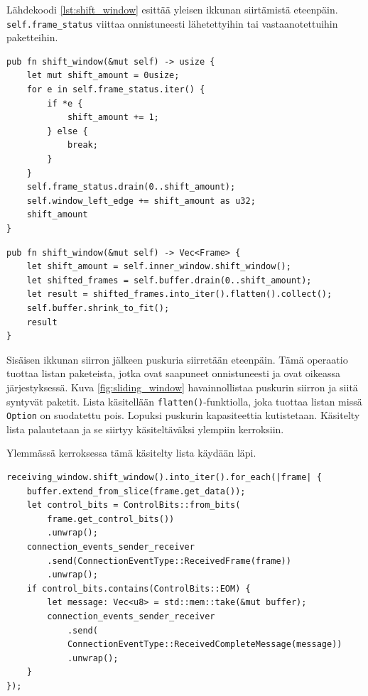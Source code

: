\documentclass[a4paper,12pt]{article}
\begin{document}
    Lähdekoodi \ref{lst:shift_window} esittää yleisen ikkunan siirtämistä eteenpäin.
    \lstinline{self.frame_status} viittaa onnistuneesti lähetettyihin tai vastaanotettuihin paketteihin.

    \begin{lstlisting}[caption={Ikkunan siirto}, label={lst:shift_window}]
pub fn shift_window(&mut self) -> usize {
    let mut shift_amount = 0usize;
    for e in self.frame_status.iter() {
        if *e {
            shift_amount += 1;
        } else {
            break;
        }
    }
    self.frame_status.drain(0..shift_amount);
    self.window_left_edge += shift_amount as u32;
    shift_amount
}\end{lstlisting}


    \begin{lstlisting}[caption={Vastaanottajan ikkunan siirto}, label={lst:shift_rwindow}]
pub fn shift_window(&mut self) -> Vec<Frame> {
    let shift_amount = self.inner_window.shift_window();
    let shifted_frames = self.buffer.drain(0..shift_amount);
    let result = shifted_frames.into_iter().flatten().collect();
    self.buffer.shrink_to_fit();
    result
}\end{lstlisting}

    Sisäisen ikkunan siirron jälkeen puskuria siirretään eteenpäin. Tämä operaatio tuottaa
    listan paketeista, jotka ovat saapuneet onnistuneesti ja ovat oikeassa järjestyksessä. Kuva \ref{fig:sliding_window} havainnollistaa puskurin siirron ja siitä syntyvät paketit.
    Lista käsitellään \lstinline{flatten()}-funktiolla, joka tuottaa listan missä \lstinline{Option}
    on suodatettu pois. Lopuksi puskurin kapasiteettia kutistetaan. Käsitelty lista palautetaan ja se siirtyy käsiteltäväksi ylempiin kerroksiin. \par

    Ylemmässä kerroksessa tämä käsitelty lista käydään läpi.

    \begin{lstlisting}[caption={Pakettien käsittely}, label={lst:handle_shift_window}]
receiving_window.shift_window().into_iter().for_each(|frame| {
    buffer.extend_from_slice(frame.get_data());
    let control_bits = ControlBits::from_bits(
        frame.get_control_bits())
        .unwrap();
    connection_events_sender_receiver
        .send(ConnectionEventType::ReceivedFrame(frame))
        .unwrap();
    if control_bits.contains(ControlBits::EOM) {
        let message: Vec<u8> = std::mem::take(&mut buffer);
        connection_events_sender_receiver
            .send(
            ConnectionEventType::ReceivedCompleteMessage(message))
            .unwrap();
    }
});\end{lstlisting}
\end{document}
